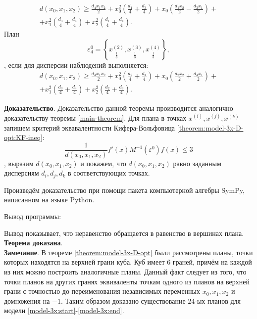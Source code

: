 \begin{theorem}
	\begin{multline}\label{theorem:model-3x-D-opt:plan-3-d}
	d(x_0, x_1, x_2) \ge \frac{d_{4} x_{1} x_{2}}{2} + x_{0}^{2} \left(\frac{d_{1}}{4} + \frac{d_{3}}{4}\right) + x_{0} \left(\frac{d_{1} x_{2}}{2} - \frac{d_{3} x_{1}}{2}\right) + \\ + x_{1}^{2} \left(\frac{d_{3}}{4} + \frac{d_{4}}{4}\right) + x_{2}^{2} \left(\frac{d_{1}}{4} + \frac{d_{4}}{4}\right).
	\end{multline}
	План 
	\begin{equation} \label{theorem:model-3x-D-opt:plan-4}
	\varepsilon_4^{0} = \left \{ 
	\underset{\frac 1 3} {x^{(2)}},
	\underset{\frac 1 3} {x^{(3)}},
	\underset{\frac 1 3} {x^{(4)}}
	\right \},
	\end{equation},
	если для дисперсии наблюдений выполняется:
	\begin{multline}\label{theorem:model-3x-D-opt:plan-4-d}
	d(x_0, x_1, x_2) \ge \frac{d_{3} x_{1} x_{2}}{2} + x_{0}^{2} \left(\frac{d_{2}}{4} + \frac{d_{4}}{4}\right) + x_{0} \left(\frac{d_{2} x_{2}}{2} + \frac{d_{4} x_{1}}{2}\right) + \\ + x_{1}^{2} \left(\frac{d_{3}}{4} + \frac{d_{4}}{4}\right) + x_{2}^{2} \left(\frac{d_{2}}{4} + \frac{d_{3}}{4}\right).
	\end{multline}		
\end{theorem}

\textbf{Доказательство}. Доказательство данной теоремы производится аналогично доказательству теоремы \ref{main-theorem}. Для плана в точках $x^{(i)}, x^{(j)}, x^{(k)}$ запишем критерий эквавалентности Кифера-Вольфовица \eqref{theorem:model-3x-D-opt:KF-ineq}:
\begin{equation}\label{theorem:model-3x-D-opt:KF-ineq}
\frac{1}{d(x_0, x_1, x_2)} f'(x) M^{-1}(\varepsilon^0) f(x) \le 3
\end{equation},
выразим $d(x_0, x_1, x_2)$ и покажем, что $d(x_0, x_1, x_2)$ равно заданным дисперсиям $d_i, d_j, d_k$ в соответствующих точках.

Произведём доказательство при помощи пакета компьютерной алгебры SymPy, написанном на языке Python.

Вывод программы:

Вывод показывает, что неравенство обращается в равенство в вершинах плана. \textbf{Теорема доказана}.\\

\textbf{Замечание}.
В теореме \ref{theorem:model-3x-D-opt} были рассмотрены планы, точки которых находятся на верхней грани куба. Куб имеет 6 граней, причём на каждой из них можно построить аналогичные планы. Данный факт следует из того, что точки планов на других гранях эквиваленты точкам одного из планов на верхней грани с точностью до переименования независимых переменных $x_0, x_1, x_2$ и домножения на $-1$. Таким образом доказано существование $24$-ых планов для модели \eqref{model-3x:start}-\eqref{model-3x:end}.	

